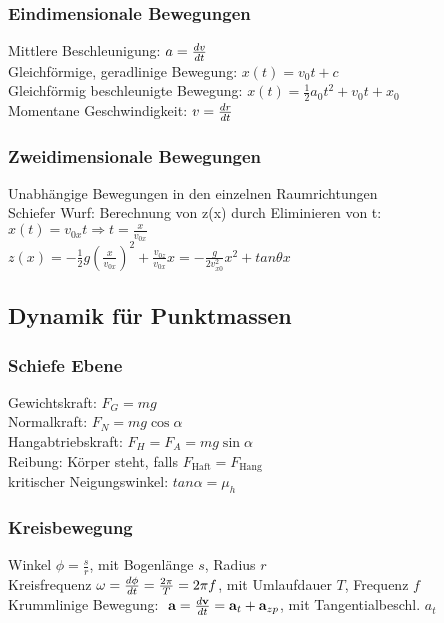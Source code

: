 \documentclass[fs, footer]{latex4ei}
\begin{document}
\begin{multicols*}{4}
\subsubsection{Eindimensionale Bewegungen}
Mittlere Beschleunigung: $a = \frac{dv}{dt}$\\
Gleichförmige, geradlinige Bewegung: $x(t) = v_0t+c$\\
Gleichförmig beschleunigte Bewegung: $x(t) = \frac{1}{2}a_0t^2+v_0t+x_0$\\
Momentane Geschwindigkeit: $v = \frac{dr}{dt}$\\
\subsubsection{Zweidimensionale Bewegungen}
Unabhängige Bewegungen in den einzelnen Raumrichtungen\\
Schiefer Wurf:
Berechnung von z(x) durch Eliminieren von t: \\$x(t) = v_{0x}t \Rightarrow t = \frac{x}{v_{0x}}$\\
$z(x) = -\frac{1}{2}g(\frac{{x}}{v_{0x}})^2 + \frac{v_{0z}}{v_{0x}}x = -\frac{g}{2v^2_{x0}}x^2 + tan\theta x$\\
\subsection{Dynamik für Punktmassen}
\subsubsection{Schiefe Ebene}
Gewichtskraft: $F_G = mg$\\
Normalkraft: $F_N = mg\cos \alpha$\\
Hangabtriebskraft: $F_H = F_A = mg\sin \alpha$\\
Reibung: Körper steht, falls $F_{\text{Haft}} = F_{\text{Hang}}$\\
kritischer Neigungswinkel: $tan \alpha = \mu_h$\\
\subsubsection{Kreisbewegung}
Winkel $\phi = \frac{s}{r}$, mit Bogenlänge $s$, Radius $r$\\
Kreisfrequenz $\omega = \frac{d\phi}{dt} = \frac{2\pi}{T} = 2\pi f$, mit Umlaufdauer $T$, Frequenz $f$\\
Krummlinige Bewegung: $\ \textbf{a} = \frac{d\textbf{v}}{dt} = \textbf{a}_t + \textbf{a}_{zp}$, mit Tangentialbeschl. $a_t$\\


\end{multicols*}
\end{document}
